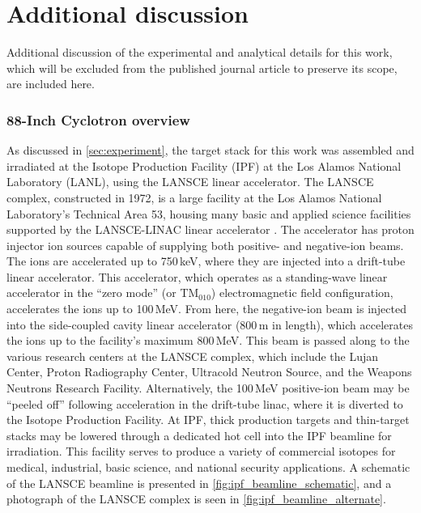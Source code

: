 % 
% 



% 
% 






\section{Additional discussion}


Additional discussion of the experimental and analytical details for this work, which will be excluded from the published journal article to preserve its scope, are included here.

\subsubsection{88-Inch Cyclotron overview}


As discussed in \autoref{sec:experiment}, the target stack for this work was assembled and irradiated at the Isotope Production Facility (IPF) at the Los Alamos National Laboratory (LANL), using the LANSCE linear accelerator. 
The LANSCE complex, constructed in 1972, is a large facility at the Los Alamos National Laboratory's Technical Area 53, housing many basic and applied science facilities supported by the LANSCE-LINAC linear accelerator \cite{Lisowski2006}.
The accelerator has proton injector ion sources capable of supplying both positive- and negative-ion beams.
The ions are accelerated up to 750\,keV, where they are injected into a drift-tube linear accelerator.
This accelerator, which operates as a standing-wave linear accelerator in the \enquote{zero mode} (or TM$_{010}$) electromagnetic field configuration, accelerates the ions up to 100\,MeV.  
From here, the negative-ion beam is injected into the side-coupled cavity linear accelerator (800\,m in length), which accelerates the ions up to the facility's maximum 800\,MeV.
This beam is passed along to the various research centers at the LANSCE complex, which include the Lujan Center, Proton Radiography Center, Ultracold Neutron Source, and the Weapons Neutrons Research Facility.
Alternatively, the 100\,MeV positive-ion beam may be \enquote{peeled off} following acceleration in the drift-tube linac, where it is diverted to the Isotope Production Facility.
At IPF, thick production targets and thin-target stacks may be lowered through a dedicated hot cell into the IPF beamline for irradiation.
This facility serves to produce a variety of commercial isotopes for  medical, industrial, basic science, and national security applications.
A schematic of the LANSCE beamline is presented in \autoref{fig:ipf_beamline_schematic}, and a photograph of the LANSCE complex is seen in \autoref{fig:ipf_beamline_alternate}.

